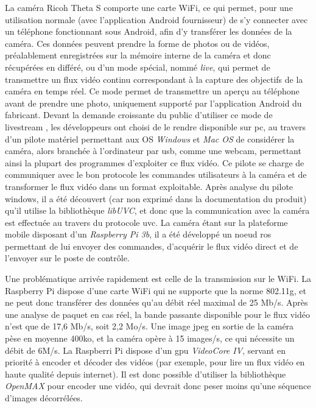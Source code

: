 			La caméra Ricoh Theta S comporte une carte WiFi, ce qui permet, pour une utilisation \og normale \fg{} (avec l'application Android fournisseur) de s'y connecter avec un téléphone fonctionnant sous Android, afin d'y transférer les données de la caméra. Ces données peuvent prendre la forme de photos ou de vidéos, préalablement enregistrées sur la mémoire interne de la caméra et donc récupérées en différé, ou d'un mode spécial, nommé \emph{live}, qui permet de transmettre un flux vidéo continu correspondant à la capture des objectifs de la caméra en temps réel. Ce mode permet de transmettre un aperçu au téléphone avant de prendre une photo, uniquement supporté par l'application Android du fabricant. Devant la demande croissante du public d'utiliser ce mode de \og livestream \fg{}, les développeurs ont choisi de le rendre disponible sur pc, au travers d'un pilote matériel permettant aux OS \emph{Windows} et \emph{Mac OS} de considérer la caméra, alors branchée à l'ordinateur par \gls{usb}, comme une webcam, permettant ainsi la plupart des programmes d'exploiter ce flux vidéo. Ce pilote se charge de communiquer avec le bon protocole les commandes utilisateurs à la caméra et de transformer le flux vidéo dans un format exploitable. Après analyse du pilote windows, il a été découvert (car non exprimé dans la documentation du produit) qu'il utilise la bibliothèque \emph{libUVC}, et donc que la communication avec la caméra est effectuée au travers du protocole \gls{uvc}. La caméra étant sur la plateforme mobile disposant d'un \emph{Raspberry Pi 3b}, il a été développé un noeud \gls{ros} permettant de lui envoyer des commandes, d'acquérir le flux vidéo direct et de l'envoyer sur le poste de contrôle.
			\par
			Une problématique arrivée rapidement est celle de la transmission sur le WiFi.
			La Raspberry Pi dispose d'une carte WiFi qui ne supporte que la norme 802.11g, et ne peut donc transférer des données qu'au débit réel maximal de 25 Mb/s.
			Après une analyse de paquet en cas réel, la bande passante disponible pour le flux vidéo n'est que de 17,6 Mb/s, soit 2,2 Mo/s.
			Une image \gls{jpeg} en sortie de la caméra pèse en moyenne 400ko, et la caméra opère à 15 images/s, ce qui nécessite un débit de 6M/s.
			La Raspberri Pi dispose d'un \gls{gpu} \emph{VideoCore IV}\cite{videocore}, servant en priorité à encoder et décoder des vidéos (par exemple, pour lire un flux vidéo en haute qualité depuis internet).
			Il est donc possible d'utiliser la bibliothèque \emph{OpenMAX} pour encoder une vidéo, qui devrait donc peser moins qu'une séquence d'images décorrélées.
